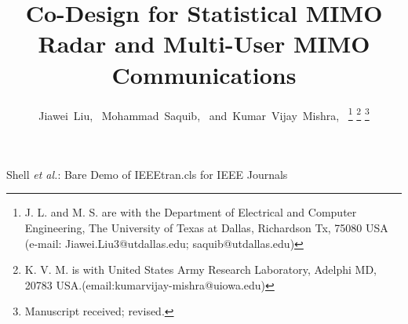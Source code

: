 \documentclass[9pt,journal]{IEEEtran}
\begin{document}
	\title{Co-Design for Statistical MIMO Radar and Multi-User MIMO Communications}
	\author{Jiawei~Liu,~
		Mohammad~Saquib,~
		and~Kumar~Vijay~Mishra,~%
		\thanks{J. L. and M. S. are with the Department
			of Electrical and Computer Engineering, The University of Texas at Dallas, Richardson
			Tx, 75080 USA (e-mail: Jiawei.Liu3@utdallas.edu; saquib@utdallas.edu)}%
		\thanks{K. V. M. is with United States Army Research Laboratory, Adelphi MD, 20783 USA.(email:kumarvijay-mishra@uiowa.edu)}%
		\thanks{Manuscript received; revised.}}
	
	{Shell \MakeLowercase{\textit{et al.}}: Bare Demo of IEEEtran.cls for IEEE Journals}
	
	
	
	
	
	
	
	
	
	
	
	\maketitle
	
\end{document}
